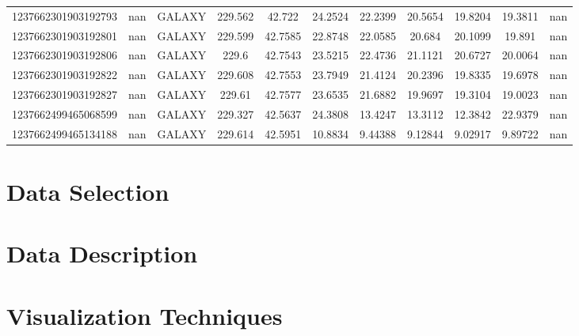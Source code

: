 \documentclass{article}
\begin{document}
\begin{table}[htbp]
{\begin{tabular}{|c|c|c|c|c|c|c|c|c|c|c|}
            1237662301903192793 & nan & GALAXY & 229.562 & 42.722 & 24.2524 & 22.2399 & 20.5654 & 19.8204 & 19.3811 & nan \\
            1237662301903192801 & nan & GALAXY & 229.599 & 42.7585 & 22.8748 & 22.0585 & 20.684 & 20.1099 & 19.891 & nan \\
            1237662301903192806 & nan & GALAXY & 229.6 & 42.7543 & 23.5215 & 22.4736 & 21.1121 & 20.6727 & 20.0064 & nan \\
            1237662301903192822 & nan & GALAXY & 229.608 & 42.7553 & 23.7949 & 21.4124 & 20.2396 & 19.8335 & 19.6978 & nan \\
            1237662301903192827 & nan & GALAXY & 229.61 & 42.7577 & 23.6535 & 21.6882 & 19.9697 & 19.3104 & 19.0023 & nan \\
            1237662499465068599 & nan & GALAXY & 229.327 & 42.5637 & 24.3808 & 13.4247 & 13.3112 & 12.3842 & 22.9379 & nan \\
            1237662499465134188 & nan & GALAXY & 229.614 & 42.5951 & 10.8834 & 9.44388 & 9.12844 & 9.02917 & 9.89722 & nan \\
            \hline
        \end{tabular}%
    }
\end{table}


\section{Data Selection}



\section{Data Description}



\section{Visualization Techniques}

\end{document}
